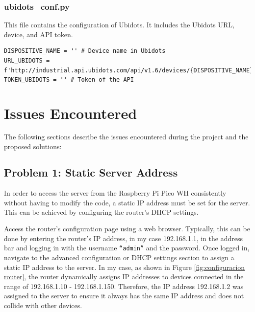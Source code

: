 \documentclass{article}
\begin{document}
\subsubsection{ubidots\_conf.py}
This file contains the configuration of Ubidots.
It includes the Ubidots URL, device, and API token.
\begin{lstlisting}
DISPOSITIVE_NAME = '' # Device name in Ubidots
URL_UBIDOTS = f'http://industrial.api.ubidots.com/api/v1.6/devices/{DISPOSITIVE_NAME}/'
TOKEN_UBIDOTS = '' # Token of the API
\end{lstlisting}

\section{Issues Encountered}

The following sections describe the issues encountered during the project and the proposed solutions:

\subsection{Problem 1: Static Server Address}

In order to access the server from the Raspberry Pi Pico WH consistently without having to modify the code, a static IP address must be set for the server. 
This can be achieved by configuring the router's DHCP settings.

Access the router's configuration page using a web browser. 
Typically, this can be done by entering the router's IP address, in my case 192.168.1.1, in the address bar and logging in with the username \texttt{``admin''} and the password. 
Once logged in, navigate to the advanced configuration or DHCP settings section to assign a static IP address to the server. 
In my case, as shown in Figure \ref{fig:configuracion router}, the router dynamically assigns IP addresses to devices connected in the range of 192.168.1.10 - 192.168.1.150. 
Therefore, the IP address 192.168.1.2 was assigned to the server to ensure it always has the same IP address and does not collide with other devices.
\end{document}
